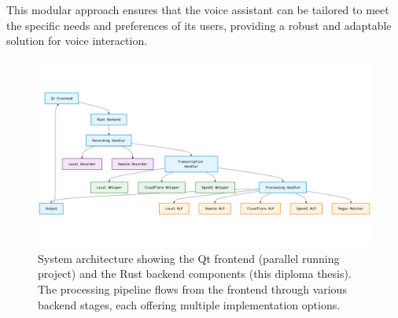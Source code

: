 This modular approach ensures that the voice assistant can be tailored
to meet the specific needs and preferences of its users, providing a
robust and adaptable solution for voice interaction.

\begin{figure}[H]
    \centering
    \includegraphics[width=\textwidth]{assets/stackchart}
    \caption{System architecture showing the Qt frontend (parallel
    running project) and the Rust backend components (this diploma
    thesis). The processing pipeline flows from the frontend through
    various backend stages, each offering multiple implementation
    options.}
    \label{fig:design}
\end{figure}